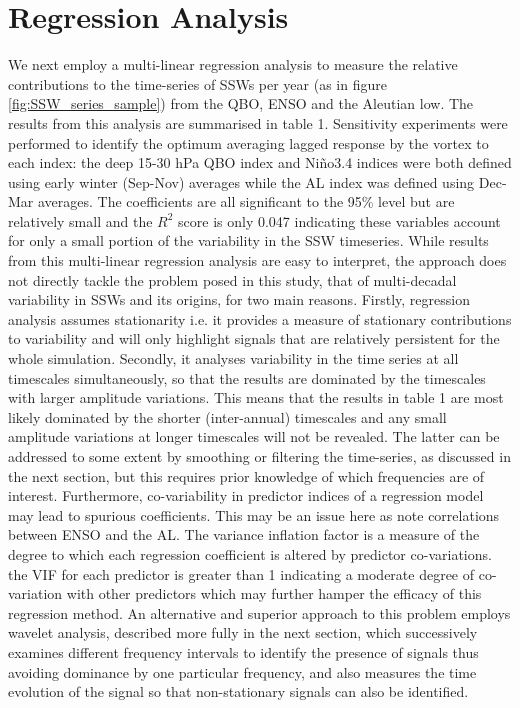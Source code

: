 \section{Regression Analysis}
We next employ a multi-linear regression analysis to measure the relative contributions to the time-series of SSWs per year (as in figure \ref{fig:SSW_series_sample}) from the QBO, ENSO and the Aleutian low. The results from this analysis are summarised in table 1.  Sensitivity experiments were performed to identify the optimum averaging lagged response by the vortex to each index: the deep 15-30 hPa QBO index and Ni\~{n}o3.4 indices were both defined using early winter (Sep-Nov) averages while the AL index was defined using Dec-Mar averages. The coefficients are all significant to the 95\% level but are relatively small and the $R^2$ score is only 0.047 indicating these variables account for only a small portion of the variability in the SSW timeseries. While results from this multi-linear regression analysis are easy to interpret, the approach does not directly tackle the problem posed in this study, that of multi-decadal variability in SSWs and its origins, for two main reasons. Firstly, regression analysis assumes stationarity i.e. it provides a measure of stationary contributions to variability and will only highlight signals that are relatively persistent for the whole simulation. Secondly, it  analyses variability in the time series at all timescales simultaneously, so that the results are dominated by the timescales with larger amplitude variations.  This means that the results in table 1 are most likely dominated by the shorter (inter-annual) timescales and any small amplitude variations at longer timescales will not be revealed. The latter can be addressed to some extent by smoothing or filtering the time-series, as discussed in the next section, but this requires prior knowledge of which frequencies are of interest. Furthermore, co-variability in predictor indices of a regression model may lead to spurious coefficients. This may be an issue here as \cite{raoModulation2019d} note correlations between ENSO and the AL. The variance inflation factor is a measure of the degree to which each regression coefficient is altered by predictor co-variations. the VIF for each predictor is greater than 1 indicating a moderate degree of co-variation with other predictors \citep{akinwandeVariance2015b} which may further hamper the efficacy of this regression method. An alternative and superior approach to this problem employs wavelet analysis, described more fully in the next section, which successively examines different frequency intervals to identify the presence of signals thus avoiding dominance by one particular frequency, and also measures the time evolution of the signal so that non-stationary signals can also be identified. 

